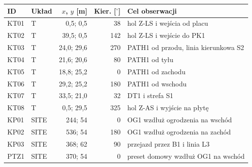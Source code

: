 \begin{center}
\small
\begin{tabularx}{\linewidth}{@{}llrrY@{}}
\toprule
ID & Układ & $x$, $y$ [m] & Kier. [$^\circ$] & Cel obserwacji \\
\midrule
KT01 & T & 0,5; 0,5 & 38 & hol Z-LS i wejścia od placu \\
KT02 & T & 39,5; 0,5 & 142 & hol Z-LS i wejście do PK1 \\
KT03 & T & 24,0; 29,6 & 270 & PATH1 od przodu, linia kierunkowa S2 \\
KT04 & T & 21,6; 20,6 & 80 & PATH1 od tyłu \\
KT05 & T & 18,8; 25,2 & 0 & PATH1 od zachodu \\
KT06 & T & 29,2; 25,2 & 180 & PATH1 od wschodu \\
KT07 & T & 33,5; 21,0 & 32 & DT1 i strefa S1 \\
KT08 & T & 0,5; 29,5 & 325 & hol Z-AS i wyjście na płytę \\
KP01 & SITE & 244; 54 & 0 & OG1 wzdłuż ogrodzenia na wschód \\
KP02 & SITE & 536; 54 & 180 & OG1 wzdłuż ogrodzenia na zachód \\
KP03 & SITE & 368; 62 & 90 & przejazd przez B1 i linia L3 \\
PTZ1 & SITE & 370; 54 & 0 & preset domowy wzdłuż OG1 na wschód \\
\bottomrule
\end{tabularx}
\end{center}
